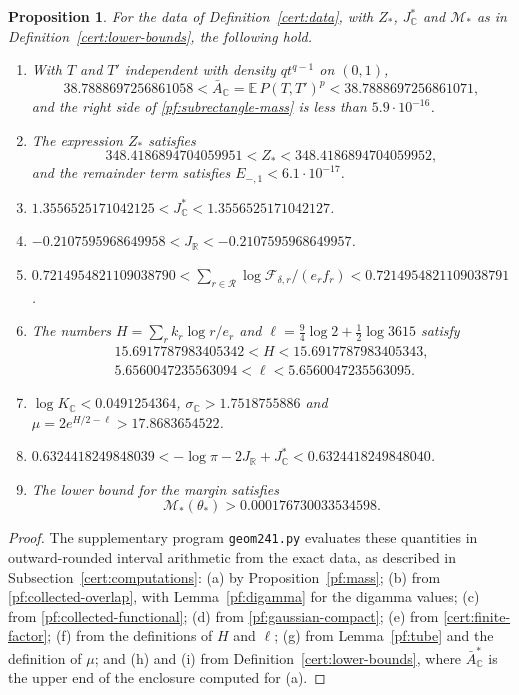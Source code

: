 \documentclass[11pt]{amsart}
\numberwithin{equation}{section}
\newtheorem{proposition}[equation]{Proposition}
\theoremstyle{definition}
\theoremstyle{remark}
\newcommand{\R}{\mathbb R}
\newcommand{\C}{\mathbb C}
\begin{document}
\begin{proposition}\label{cert:enclosures}
For the data of Definition~\ref{cert:data}, with $Z_*$, $J_\C^*$ and
$\mathcal M_*$ as in Definition~\ref{cert:lower-bounds}, the following
hold.
\begin{enumerate}
\item[(a)] With $T$ and $T'$ independent with density $qt^{q-1}$ on
$(0,1)$,
\begin{equation}\label{cert:mass}
 38.7888697256861058<\bar A_\C=\mathbb E\,P(T,T')^p<38.7888697256861071 ,
\end{equation}
and the right side of \eqref{pf:subrectangle-mass} is less than
$5.9\cdot10^{-16}$.
\item[(b)] The expression $Z_*$ satisfies
\begin{equation}\label{cert:overlap}
 348.4186894704059951<Z_*<348.4186894704059952 ,
\end{equation}
and the remainder term satisfies $E_{-,1}<6.1\cdot10^{-17}$.
\item[(c)] $1.3556525171042125<J_\C^*<1.3556525171042127$.
\item[(d)] $-0.2107595968649958<J_\R<-0.2107595968649957$.
\item[(e)] $0.7214954821109038790<\sum_{r\in\mathcal R}\log\mathcal
F_{\delta,r}/(e_rf_r)<0.7214954821109038791$.
\item[(f)] The numbers $H=\sum_rk_r\log r/e_r$ and
$\ell=\frac94\log2+\frac12\log3615$ satisfy
\begin{gather*}
 15.6917787983405342<H<15.6917787983405343,\\
 5.6560047235563094<\ell<5.6560047235563095 .
\end{gather*}
\item[(g)] $\log K_\C<0.0491254364$, $\sigma_\C>1.7518755886$ and
$\mu=2e^{H/2-\ell}>17.8683654522$.
\item[(h)] $0.6324418249848039<-\log\pi-2J_\R+J_\C^*<0.6324418249848040$.
\item[(i)] The lower bound for the margin satisfies
\begin{equation}\label{cert:margin}
 \mathcal M_*(\theta_*)>0.000176730033534598 .
\end{equation}
\end{enumerate}
\end{proposition}

\begin{proof}
The supplementary program \texttt{geom241.py} evaluates these
quantities in outward-rounded interval arithmetic from the exact data,
as described in Subsection~\ref{cert:computations}: (a) by
Proposition~\ref{pf:mass}; (b) from \eqref{pf:collected-overlap}, with
Lemma~\ref{pf:digamma} for the digamma values; (c) from
\eqref{pf:collected-functional}; (d) from \eqref{pf:gaussian-compact};
(e) from \eqref{cert:finite-factor}; (f) from the definitions of $H$ and
$\ell$; (g) from Lemma~\ref{pf:tube} and the definition of $\mu$; and
(h) and (i) from Definition~\ref{cert:lower-bounds}, where
$\bar A_\C^*$ is the upper end of the enclosure computed for (a).
\end{proof}
\end{document}

